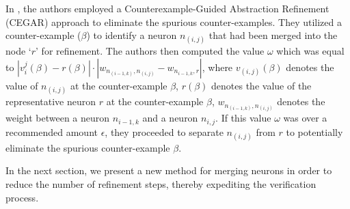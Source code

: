 In \cite{cegar-nn}, the authors employed a Counterexample-Guided Abstraction 
Refinement (CEGAR) approach to eliminate the spurious counter-examples. 
They utilized a counter-example ($\beta$) to identify a neuron $n_{(i, j)}$ 
that had been merged into the node `$r$' for refinement. The authors then 
computed the value $\omega$ which was equal to 
$|v_i^j(\beta) - r(\beta)| \cdot |w_{n_{(i-1, k)},n_{(i,j)}}-w_{n_{i-1,k},r}|$, 
where $v_{(i, j)}(\beta)$ denotes the value of $n_{(i, j)}$ at the 
counter-example $\beta$, $r(\beta)$ denotes the value of the 
representative neuron $r$ at the counter-example $\beta$, $w_{n_{(i-1,k)},n_{(i,j)}}$ 
denotes the weight between a neuron $n_{i-1,k}$ and a neuron $n_{i,j}$. 
If this value $\omega$ was over a recommended amount $\epsilon$, they proceeded to 
separate $n_{(i, j)}$ from $r$ to potentially eliminate the spurious counter-example 
$\beta$.



 In the next section, we present a new method for merging neurons in 
 order to reduce the number of refinement steps, thereby expediting the 
 verification process.
